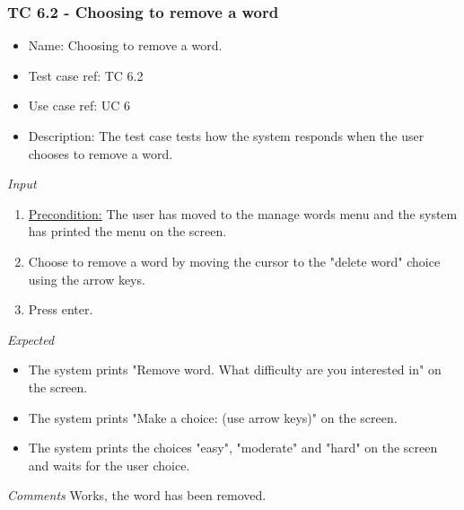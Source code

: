 \documentclass[12pt, letterpaper]{article}
\begin{document}
\subsubsection{TC 6.2 - Choosing to remove a word}
\begin{itemize}
	\item Name: Choosing to remove a word.
	\item Test case ref: TC 6.2
	\item Use case ref: UC 6
	\item Description: The test case tests how the system responds when the user chooses to remove a word.
\end{itemize}
\emph{Input}
\begin{enumerate}
	\item \underline{Precondition:} The user has moved to the manage words menu and the system has printed the menu on the screen.
	\item Choose to remove a word by moving the cursor to the "delete word" choice using the arrow keys.
	\item Press enter.
\end{enumerate}
\emph{Expected}
\begin{itemize}
	\item The system prints "Remove word. What difficulty are you interested in" on the screen.
	\item The system prints "Make a choice: (use arrow keys)" on the screen.
	\item The system prints the choices "easy", "moderate" and "hard" on the screen and waits for the user choice.
\end{itemize}
\begin{Form}
	\newline
	\newline
\end{Form}
\newline
\emph{Comments}
Works, the word has been removed.
\end{document}

